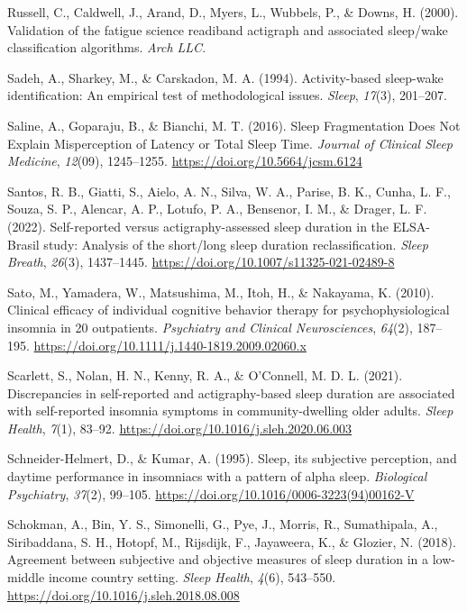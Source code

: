 \documentclass[
]{article}
\newlength{\cslhangindent}
\newenvironment{CSLReferences}[2] %
 {\begin{list}{}{%
  \setlength{\itemindent}{0pt}
  \setlength{\leftmargin}{0pt}
  \setlength{\parsep}{0pt}
  \ifodd #1
   \setlength{\leftmargin}{\cslhangindent}
   \setlength{\itemindent}{-1\cslhangindent}
  \fi
  \setlength{\itemsep}{#2\baselineskip}}}
 {\end{list}}
\begin{document}
\begin{CSLReferences}{1}{0}
Russell, C., Caldwell, J., Arand, D., Myers, L., Wubbels, P., \& Downs, H. (2000). Validation of the fatigue science readiband actigraph and associated sleep/wake classification algorithms. \emph{Arch LLC}.

Sadeh, A., Sharkey, M., \& Carskadon, M. A. (1994). Activity-based sleep-wake identification: An empirical test of methodological issues. \emph{Sleep}, \emph{17}(3), 201--207.

Saline, A., Goparaju, B., \& Bianchi, M. T. (2016). Sleep {Fragmentation} {Does} {Not} {Explain} {Misperception} of {Latency} or {Total} {Sleep} {Time}. \emph{Journal of Clinical Sleep Medicine}, \emph{12}(09), 1245--1255. \url{https://doi.org/10.5664/jcsm.6124}

Santos, R. B., Giatti, S., Aielo, A. N., Silva, W. A., Parise, B. K., Cunha, L. F., Souza, S. P., Alencar, A. P., Lotufo, P. A., Bensenor, I. M., \& Drager, L. F. (2022). Self-reported versus actigraphy-assessed sleep duration in the {ELSA}-{Brasil} study: Analysis of the short/long sleep duration reclassification. \emph{Sleep Breath}, \emph{26}(3), 1437--1445. \url{https://doi.org/10.1007/s11325-021-02489-8}

Sato, M., Yamadera, W., Matsushima, M., Itoh, H., \& Nakayama, K. (2010). Clinical efficacy of individual cognitive behavior therapy for psychophysiological insomnia in 20 outpatients. \emph{Psychiatry and Clinical Neurosciences}, \emph{64}(2), 187--195. \url{https://doi.org/10.1111/j.1440-1819.2009.02060.x}

Scarlett, S., Nolan, H. N., Kenny, R. A., \& O'Connell, M. D. L. (2021). Discrepancies in self-reported and actigraphy-based sleep duration are associated with self-reported insomnia symptoms in community-dwelling older adults. \emph{Sleep Health}, \emph{7}(1), 83--92. \url{https://doi.org/10.1016/j.sleh.2020.06.003}

Schneider-Helmert, D., \& Kumar, A. (1995). Sleep, its subjective perception, and daytime performance in insomniacs with a pattern of alpha sleep. \emph{Biological Psychiatry}, \emph{37}(2), 99--105. \url{https://doi.org/10.1016/0006-3223(94)00162-V}

Schokman, A., Bin, Y. S., Simonelli, G., Pye, J., Morris, R., Sumathipala, A., Siribaddana, S. H., Hotopf, M., Rijsdijk, F., Jayaweera, K., \& Glozier, N. (2018). Agreement between subjective and objective measures of sleep duration in a low-middle income country setting. \emph{Sleep Health}, \emph{4}(6), 543--550. \url{https://doi.org/10.1016/j.sleh.2018.08.008}


\end{CSLReferences}
\end{document}
